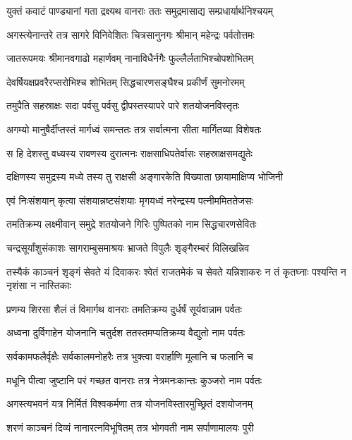 \twolineshloka
{युक्तं कवाटं पाण्ड्यानां गता द्रक्ष्यथ वानराः}
{ततः समुद्रमासाद्य सम्प्रधार्यार्थनिश्चयम्} %

\twolineshloka
{अगस्त्येनान्तरे तत्र सागरे विनिवेशितः}
{चित्रसानुनगः श्रीमान् महेन्द्रः पर्वतोत्तमः} %

\twolineshloka
{जातरूपमयः श्रीमानवगाढो महार्णवम्}
{नानाविधैर्नगैः फुल्लैर्लताभिश्चोपशोभितम्} %

\twolineshloka
{देवर्षियक्षप्रवरैरप्सरोभिश्च शोभितम्}
{सिद्धचारणसङ्घैश्च प्रकीर्णं सुमनोरमम्} %

\twolineshloka
{तमुपैति सहस्राक्षः सदा पर्वसु पर्वसु}
{द्वीपस्तस्यापरे पारे शतयोजनविस्तृतः} %

\twolineshloka
{अगम्यो मानुषैर्दीप्तस्तं मार्गध्वं समन्ततः}
{तत्र सर्वात्मना सीता मार्गितव्या विशेषतः} %

\twolineshloka
{स हि देशस्तु वध्यस्य रावणस्य दुरात्मनः}
{राक्षसाधिपतेर्वासः सहस्राक्षसमद्युतेः} %

\twolineshloka
{दक्षिणस्य समुद्रस्य मध्ये तस्य तु राक्षसी}
{अङ्गारकेति विख्याता छायामाक्षिप्य भोजिनी} %

\twolineshloka
{एवं निःसंशयान् कृत्वा संशयान्नष्टसंशयाः}
{मृगयध्वं नरेन्द्रस्य पत्नीममिततेजसः} %

\twolineshloka
{तमतिक्रम्य लक्ष्मीवान् समुद्रे शतयोजने}
{गिरिः पुष्पितको नाम सिद्धचारणसेवितः} %

\twolineshloka
{चन्द्रसूर्यांशुसंकाशः सागराम्बुसमाश्रयः}
{भ्राजते विपुलैः शृङ्गैरम्बरं विलिखन्निव} %

\threelineshloka
{तस्यैकं काञ्चनं शृङ्गं सेवते यं दिवाकरः}
{श्वेतं राजतमेकं च सेवते यन्निशाकरः}
{न तं कृतघ्नाः पश्यन्ति न नृशंसा न नास्तिकाः} %

\twolineshloka
{प्रणम्य शिरसा शैलं तं विमार्गथ वानराः}
{तमतिक्रम्य दुर्धर्षं सूर्यवान्नाम पर्वतः} %

\twolineshloka
{अध्वना दुर्विगाहेन योजनानि चतुर्दश}
{ततस्तमप्यतिक्रम्य वैद्युतो नाम पर्वतः} %

\twolineshloka
{सर्वकामफलैर्वृक्षैः सर्वकालमनोहरैः}
{तत्र भुक्त्वा वरार्हाणि मूलानि च फलानि च} %

\twolineshloka
{मधूनि पीत्वा जुष्टानि परं गच्छत वानराः}
{तत्र नेत्रमनःकान्तः कुञ्जरो नाम पर्वतः} %

\twolineshloka
{अगस्त्यभवनं यत्र निर्मितं विश्वकर्मणा}
{तत्र योजनविस्तारमुच्छ्रितं दशयोजनम्} %

\twolineshloka
{शरणं काञ्चनं दिव्यं नानारत्नविभूषितम्}
{तत्र भोगवती नाम सर्पाणामालयः पुरी} %

